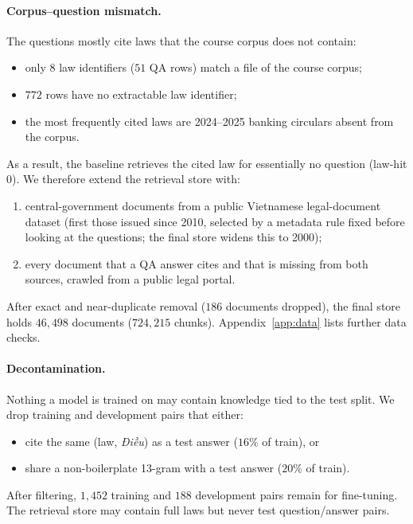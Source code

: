 \documentclass[11pt,a4paper]{article}
\newcommand{\dieu}{\textit{Điều}}
\begin{document}
\paragraph{Corpus--question mismatch.}
The questions mostly cite laws that the course corpus does not contain:
\begin{itemize}[leftmargin=*]
\item only $8$ law identifiers ($51$ QA rows) match a file of the course corpus;
\item $772$ rows have no extractable law identifier;
\item the most frequently cited laws are 2024--2025 banking circulars absent from the corpus.
\end{itemize}
As a result, the baseline retrieves the cited law for essentially no question (law-hit $0$). We therefore extend the retrieval store with:
\begin{enumerate}[leftmargin=*,label=(\roman*)]
\item central-government documents from a public Vietnamese legal-document dataset (first those issued since 2010, selected by a metadata rule fixed before looking at the questions; the final store widens this to 2000);
\item every document that a QA answer cites and that is missing from both sources, crawled from a public legal portal.
\end{enumerate}
After exact and near-duplicate removal ($186$ documents dropped), the final store holds $46{,}498$ documents ($724{,}215$ chunks). Appendix~\ref{app:data} lists further data checks.

\paragraph{Decontamination.}
Nothing a model is trained on may contain knowledge tied to the test split. We drop training and development pairs that either:
\begin{itemize}[leftmargin=*]
\item cite the same (law, \dieu) as a test answer ($16\%$ of train), or
\item share a non-boilerplate 13-gram with a test answer ($20\%$ of train).
\end{itemize}
After filtering, $1{,}452$ training and $188$ development pairs remain for fine-tuning. The retrieval store may contain full laws but never test question/answer pairs.
\end{document}
